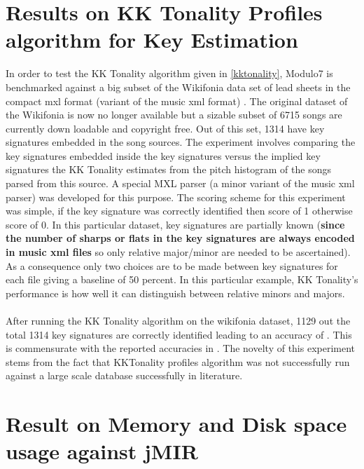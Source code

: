 \section{Results on KK Tonality Profiles algorithm for Key Estimation}

\noindent In order to test the KK Tonality algorithm given in \ref{kktonality}, Modulo7 is benchmarked against a big subset of the Wikifonia data set of lead sheets in the compact mxl format (variant of the music xml format) \cite{WikifoniaDataset}. The original dataset of the Wikifonia is now no longer available but a sizable subset of 6715 songs are currently down loadable and copyright free. Out of this set, 1314 have key signatures embedded in the song sources. The experiment involves comparing the key signatures embedded inside the key signatures versus the implied key signatures the KK Tonality estimates from the pitch histogram of the songs parsed from this source. A special MXL parser (a minor variant of the music xml parser) was developed for this purpose. The scoring scheme for this experiment was simple, if the key signature was correctly identified then score of 1 otherwise score of 0. In this particular dataset, key signatures are partially known (\textbf{since the number of sharps or flats in the key signatures are always encoded in music xml files} so only relative major/minor are needed to be ascertained). As a consequence only two choices are to be made between key signatures for each file giving a baseline of 50 percent. In this particular example, KK Tonality's performance is how well it can distinguish between relative minors and majors. \\\\
After running the KK Tonality algorithm on the wikifonia dataset, 1129 out the total 1314 key signatures are correctly identified leading to an accuracy of . This is commensurate with the reported accuracies in \cite{kkTonalityKeyFinding}. The novelty of this experiment stems from the fact that KKTonality profiles algorithm was not successfully run against a large scale database successfully in literature. 

\section{Result on Memory and Disk space usage against jMIR}

